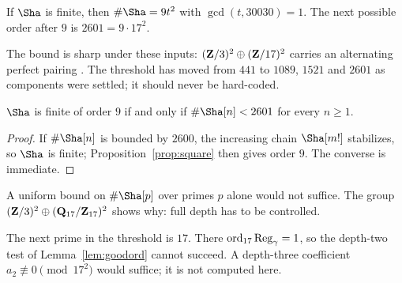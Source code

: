 \begin{proposition}\label{prop:square}
If $\Sha$ is finite, then $\#\Sha=9t^2$ with $\gcd(t,30030)=1$. The next possible order after $9$ is $2601=9\cdot17^2$.
\end{proposition}
The bound is sharp under these inputs: $(\mathbf{Z}/3)^2\oplus(\mathbf{Z}/17)^2$ carries an alternating perfect pairing \cite{poonenstoll}. The threshold has moved from $441$ to $1089$, $1521$ and $2601$ as components were settled; it should never be hard-coded.

\begin{proposition}\label{prop:uniform}
$\Sha$ is finite of order $9$ if and only if $\#\Sha[n]<2601$ for every $n\ge1$.
\end{proposition}
\begin{proof}
If $\#\Sha[n]$ is bounded by $2600$, the increasing chain $\Sha[m!]$ stabilizes, so $\Sha$ is finite; Proposition~\ref{prop:square} then gives order $9$. The converse is immediate.
\end{proof}
A uniform bound on $\#\Sha[p]$ over primes $p$ alone would not suffice. The group $(\mathbf{Z}/3)^2\oplus(\mathbf{Q}_{17}/\mathbf{Z}_{17})^2$ shows why: full depth has to be controlled.

\begin{remark}\label{rem:17}
The next prime in the threshold is $17$. There $\operatorname{ord}_{17}\operatorname{Reg}_\gamma=1$, so the depth-two test of Lemma~\ref{lem:goodord} cannot succeed. A depth-three coefficient $a_2\not\equiv0\pmod{17^2}$ would suffice; it is not computed here.
\end{remark}
